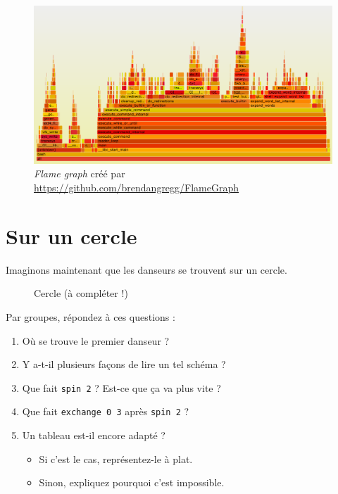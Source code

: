 \documentclass[11pt,a4paper,oneside]{book}
\begin{document}
\begin{figure}[ht]
	\centering
	\includegraphics[width=0.7\linewidth]{cpu-bash-flamegraph.png}
	\caption{\emph{Flame graph} créé par
	\url{https://github.com/brendangregg/FlameGraph}}
	\label{fig:flamegraph}
\end{figure}

\section{Sur un cercle}
Imaginons maintenant que les danseurs se trouvent sur un cercle.

\begin{figure}
	\centering
	\caption{Cercle (à compléter !)}
	\label{fig:circle}
\end{figure}

Par groupes, répondez à ces questions :

\begin{enumerate}
\item Où se trouve le premier danseur ?
\item Y a-t-il plusieurs façons de lire un tel schéma ?
\item Que fait \texttt{spin 2} ? Est-ce que ça va plus vite ?
\item Que fait \texttt{exchange 0 3} après \texttt{spin 2} ?
\item Un tableau est-il encore adapté ?
	\begin{itemize}
	\item Si c'est le cas, représentez-le à plat.
	\item Sinon, expliquez pourquoi c'est impossible.
	\end{itemize}
\end{enumerate}
\end{document}
